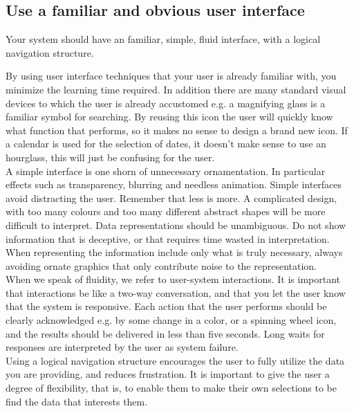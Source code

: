 \subsection{Use a familiar and obvious user interface}

Your system should have an familiar, simple, fluid interface, with a logical navigation structure.

By using user interface techniques that your user is already familiar with, you minimize the learning time required.
In addition there are many standard visual devices to which the user is already accustomed e.g. a magnifying glass is a familiar symbol for searching.
By reusing this icon the user will quickly know what function that performs, so it makes no sense to design a brand new icon.
If a calendar is used for the selection of dates, it doesn't make sense to use an hourglass, this will just be confusing for the user.\\

A simple interface is one shorn of unnecessary ornamentation. In particular effects such as transparency, blurring and needless animation.
Simple interfaces avoid distracting the user. Remember that less is more.
A complicated design, with too many colours and too many different abstract shapes will be more difficult to interpret.
Data representations should be unambiguous.
Do not show information that is deceptive, or that requires time wasted in interpretation.
When representing the information include only what is truly necessary, always avoiding ornate graphics that only contribute noise to the representation.\\

When we speak of fluidity, we refer to user-system interactions.
It is important that interactions be like a two-way conversation, and that you let the user know that the system is responsive.
Each action that the user performs should be clearly acknowledged e.g. by some change in a color, or a spinning wheel icon, and the results should be delivered in less than five seconds.
Long waits for responses are interpreted by the user as system failure.\\
    
Using a logical navigation structure encourages the user to fully utilize the data you are providing, and reduces frustration.
It is important to give the user a degree of flexibility, that is, to enable them to make their own selections to be find the data that interests them.\\

